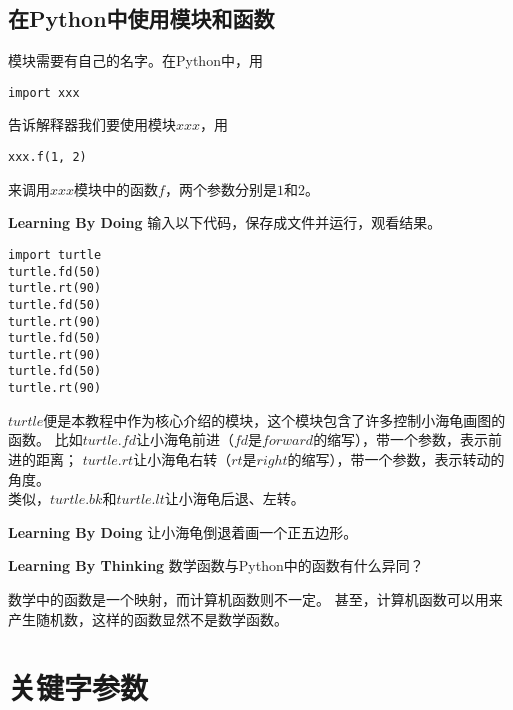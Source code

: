 \subsection{在Python中使用模块和函数}
模块需要有自己的名字。在Python中，用
\begin{lstlisting}[style=PythonStyle1]
	import xxx
\end{lstlisting}
告诉解释器我们要使用模块$xxx$，用
\begin{lstlisting}[style=PythonStyle1]
	xxx.f(1, 2)
\end{lstlisting}
来调用$xxx$模块中的函数$f$，两个参数分别是$1$和$2$。
\begin{paperbox}{\textbf{Learning By Doing}\starfive}
输入以下代码，保存成文件并运行，观看结果。
\begin{lstlisting}[style=PythonStyle1, caption=Rectangle]
import turtle
turtle.fd(50)
turtle.rt(90)
turtle.fd(50)
turtle.rt(90)
turtle.fd(50)
turtle.rt(90)
turtle.fd(50)
turtle.rt(90)
\end{lstlisting}
\end{paperbox}
$turtle$便是本教程中作为核心介绍的模块，这个模块包含了许多控制小海龟画图的函数。
比如$turtle.fd$让小海龟前进（$fd$是$forward$的缩写），带一个参数，表示前进的距离；
$turtle.rt$让小海龟右转（$rt$是$right$的缩写），带一个参数，表示转动的角度。\\
类似，$turtle.bk$和$turtle.lt$让小海龟后退、左转。
\begin{paperbox}{\textbf{Learning By Doing}\starfive}
让小海龟倒退着画一个正五边形。
\end{paperbox}
\begin{paperbox}{\textbf{Learning By Thinking\starthree}}
数学函数与Python中的函数有什么异同？
\end{paperbox}
数学中的函数是一个映射，而计算机函数则不一定。
甚至，计算机函数可以用来产生随机数，这样的函数显然不是数学函数。
\section{关键字参数}

